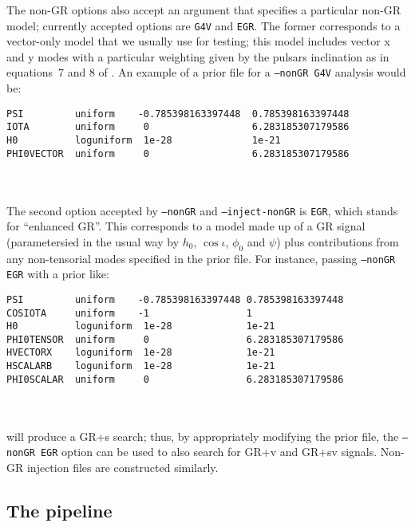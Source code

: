 The non-GR options also accept an argument that specifies a particular non-GR model; currently accepted options are {\tt G4V} and {\tt EGR}. The former corresponds
to a vector-only model \citep[proposed in][]{2015arXiv150304866M} that we usually use for testing; this model includes vector x and y modes with a particular
weighting given by the pulsars inclination as in equations~7 and 8 of \citet{2015PhRvD..91h2002I}. An example of a prior file for a {\tt --nonGR G4V} analysis
would be:
\begin{lrbox}{\Lst}
\begin{lstlisting}
PSI         uniform    -0.785398163397448  0.785398163397448
IOTA        uniform     0                  6.283185307179586
H0          loguniform  1e-28              1e-21
PHI0VECTOR  uniform     0                  6.283185307179586
\end{lstlisting}
\end{lrbox}
\\[5pt] \indent \fbox{\usebox{\Lst}} \\[5pt]
The second option accepted by {\tt --nonGR} and {\tt --inject-nonGR} is {\tt EGR}, which stands for ``enhanced GR''. This corresponds to a model made up of a GR signal
(parametersied in the usual way by $h_0$, $\cos{\iota}$, $\phi_0$ and $\psi$) plus contributions from any non-tensorial modes specified in the prior file. For instance, passing {\tt --nonGR EGR} with a prior like:
\begin{lrbox}{\Lst}
\begin{lstlisting}
PSI         uniform    -0.785398163397448 0.785398163397448
COSIOTA     uniform    -1                 1
H0          loguniform  1e-28             1e-21
PHI0TENSOR  uniform     0                 6.283185307179586
HVECTORX    loguniform  1e-28             1e-21
HSCALARB    loguniform  1e-28             1e-21
PHI0SCALAR  uniform     0                 6.283185307179586
\end{lstlisting}
\end{lrbox}
\\[5pt] \indent \fbox{\usebox{\Lst}} \\[5pt]
will produce a GR+s search; thus, by appropriately modifying the prior file, the {\tt --nonGR EGR} option can be used to also search for GR+v and GR+sv signals.
Non-GR injection files are constructed similarly. 

\subsection{The pipeline}

